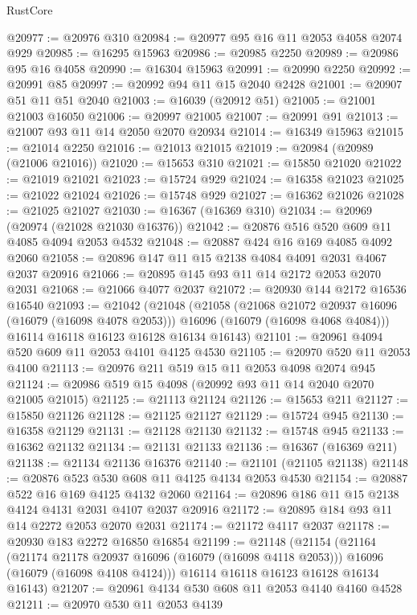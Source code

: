 \begin{lexlean}{RustCore}
\begin{coremodule}
@20977 := @20976 @310
@20984 := @20977 @95 @16 @11 @2053 @4058 @2074 @929
@20985 := @16295 @15963
@20986 := @20985 @2250
@20989 := @20986 @95 @16 @4058
@20990 := @16304 @15963
@20991 := @20990 @2250
@20992 := @20991 @85
@20997 := @20992 @94 @11 @15 @2040 @2428
@21001 := @20907 @51 @11 @51 @2040
@21003 := @16039 (@20912 @51)
@21005 := @21001 @21003 @16050
@21006 := @20997 @21005
@21007 := @20991 @91
@21013 := @21007 @93 @11 @14 @2050 @2070 @20934
@21014 := @16349 @15963
@21015 := @21014 @2250
@21016 := @21013 @21015
@21019 := @20984 (@20989 (@21006 @21016))
@21020 := @15653 @310
@21021 := @15850 @21020
@21022 := @21019 @21021
@21023 := @15724 @929
@21024 := @16358 @21023
@21025 := @21022 @21024
@21026 := @15748 @929
@21027 := @16362 @21026
@21028 := @21025 @21027
@21030 := @16367 (@16369 @310)
@21034 := @20969 (@20974 (@21028 @21030 @16376))
@21042 := @20876 @516 @520 @609 @11 @4085 @4094 @2053 @4532
@21048 := @20887 @424 @16 @169 @4085 @4092 @2060
@21058 := @20896 @147 @11 @15 @2138 @4084 @4091 @2031 @4067 @2037 @20916
@21066 := @20895 @145 @93 @11 @14 @2172 @2053 @2070 @2031
@21068 := @21066 @4077 @2037
@21072 := @20930 @144 @2172 @16536 @16540
@21093 := @21042
    (@21048
      (@21058
        (@21068 @21072 @20937 @16096 (@16079 (@16098 @4078 @2053)))
        @16096
        (@16079 (@16098 @4068 @4084)))
      @16114
      @16118
      @16123
      @16128
      @16134
      @16143)
@21101 := @20961 @4094 @520 @609 @11 @2053 @4101 @4125 @4530
@21105 := @20970 @520 @11 @2053 @4100
@21113 := @20976 @211 @519 @15 @11 @2053 @4098 @2074 @945
@21124 := @20986 @519 @15 @4098 (@20992 @93 @11 @14 @2040 @2070 @21005 @21015)
@21125 := @21113 @21124
@21126 := @15653 @211
@21127 := @15850 @21126
@21128 := @21125 @21127
@21129 := @15724 @945
@21130 := @16358 @21129
@21131 := @21128 @21130
@21132 := @15748 @945
@21133 := @16362 @21132
@21134 := @21131 @21133
@21136 := @16367 (@16369 @211)
@21138 := @21134 @21136 @16376
@21140 := @21101 (@21105 @21138)
@21148 := @20876 @523 @530 @608 @11 @4125 @4134 @2053 @4530
@21154 := @20887 @522 @16 @169 @4125 @4132 @2060
@21164 := @20896 @186 @11 @15 @2138 @4124 @4131 @2031 @4107 @2037 @20916
@21172 := @20895 @184 @93 @11 @14 @2272 @2053 @2070 @2031
@21174 := @21172 @4117 @2037
@21178 := @20930 @183 @2272 @16850 @16854
@21199 := @21148
    (@21154
      (@21164
        (@21174 @21178 @20937 @16096 (@16079 (@16098 @4118 @2053)))
        @16096
        (@16079 (@16098 @4108 @4124)))
      @16114
      @16118
      @16123
      @16128
      @16134
      @16143)
@21207 := @20961 @4134 @530 @608 @11 @2053 @4140 @4160 @4528
@21211 := @20970 @530 @11 @2053 @4139

\end{coremodule}
\end{lexlean}
